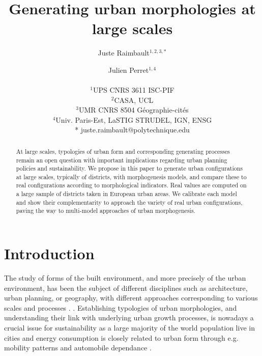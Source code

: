 \documentclass[letterpaper]{article}
\title{Generating urban morphologies at large scales}
\author{Juste Raimbault$^{1,2,3,*}$ \and Julien Perret$^{1,4}$ \\
\mbox{}\\
$^1$UPS CNRS 3611 ISC-PIF\\
$^2$CASA, UCL\\
$^3$UMR CNRS 8504 G{\'e}ographie-cit{\'e}s\\
$^4$Univ. Paris-Est, LaSTIG STRUDEL, IGN, ENSG\\
\medskip
* juste.raimbault@polytechnique.edu} %
\begin{document}
\maketitle

\begin{abstract}
  At large scales, typologies of urban form and corresponding generating processes remain an open question with important implications regarding urban planning policies and sustainability.
  We propose in this paper to generate urban configurations at large scales, typically of districts, with morphogenesis models, and compare these to real configurations according to morphological indicators.
  Real values are computed on a large sample of districts taken in European urban areas.
  We calibrate each model and show their complementarity to approach the variety of real urban configurations, paving the way to multi-model approaches of urban morphogenesis.
\end{abstract}


\section{Introduction}


The study of forms of the built environment, and more precisely of the urban environment, has been the subject of different disciplines such as architecture, urban planning, or geography, with different approaches corresponding to various scales and processes \citep{moudon1997urban,gauthier2006mapping,kropf2009aspects}. \citep{doursat2012morphogenetic}.
Establishing typologies of urban morphologies, and understanding their link with underlying urban growth processes, is nowadays a crucial issue for sustainability as a large majority of the world population live in cities and energy consumption is closely related to urban form through e.g. mobility patterns and automobile dependance \citep{newman2000sustainable}.
\end{document}
